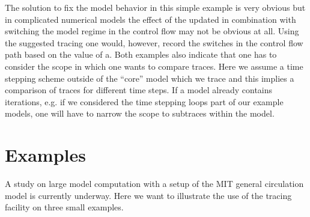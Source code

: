 \documentclass{article}
\begin{document}
The solution to fix the model behavior in this simple example is very obvious
but in complicated numerical models the effect of the updated in combination with 
switching the model regime in the control flow may not be obvious at all. 
Using the suggested tracing one would, however, record the switches in 
the control flow path based on the value of a. 
Both examples also indicate that one has to consider the  scope in which 
one wants to compare traces. Here we assume a time stepping scheme 
outside of the ``core'' model which we trace and this implies a comparison 
of traces for different time steps.  
If a model already contains iterations, e.g. if we considered the time stepping 
loops part of our example models, one will have to narrow the scope to 
subtraces within the model. 

\section{Examples}
A study on large model computation with  a setup of the MIT general circulation model 
is currently underway.  
Here we want to illustrate the use of the tracing facility on three small examples.
\end{document}
